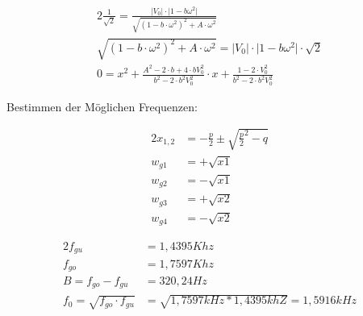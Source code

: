 \begin{alignat}{2}
\frac{1}{\sqrt{2}} = \frac{\lvert V_{0} \rvert \cdot \lvert 1- b \omega^2 \rvert}{\sqrt{(1- b \cdot \omega^2)^2 + A \cdot \omega^2}}\\
\sqrt{(1- b \cdot \omega^2)^2 + A \cdot \omega^2} = \lvert V_{0} \rvert \cdot \lvert 1- b \omega^2 \rvert \cdot \sqrt{2}\\
0 = x^2 + \frac{A^2 - 2 \cdot b + 4 \cdot b V_{0}^2}{b^2 - 2 \cdot b^2 V_{0}^2} \cdot x + \frac{1-2\cdot V_{0}^2}{b^2 - 2 \cdot b^2 V_{0}^2}
\end{alignat}

\noindent Bestimmen der Möglichen Frequenzen:

\begin{alignat}{2}
x_{1,2} &= -\frac{p}{2} \pm \sqrt{\frac{p}{2}^2 - q}\\
w_{g1} &= +\sqrt{x1}\\
w_{g2} &= -\sqrt{x1}\\
w_{g3} &= +\sqrt{x2}\\
w_{g4} &= -\sqrt{x2}
\end{alignat}

\begin{alignat}{2}
f_{gu} &= 1,4395Khz\\
f_{go} &= 1,7597Khz\\
B = f_{go} - f_{gu} &= 320,24Hz\\
f_{0} = \sqrt{f_{go} \cdot f_{gu}} &= \sqrt{1,7597kHz * 1,4395khZ} = 1,5916kHz
\end{alignat}

